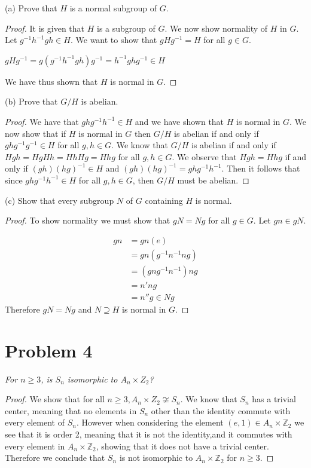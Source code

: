 \documentclass{article}
\theoremstyle{plain} %
\theoremstyle{definition} %
\begin{document}
\noindent(a) Prove that $H$ is a normal subgroup of $G$.

\begin{proof}
It is given that $H$ is a subgroup of $G$. We now show normality of $H$
in $G$. Let $g^{-1}h^{-1}gh \in H$. We want to show that $gHg^{-1} = H$ for all $g \in G$.
\begin{center}
    $gHg^{-1} = g(g^{-1}h^{-1}gh)g^{-1} = h^{-1}ghg^{-1} \in H$
\end{center}

We have thus shown that $H$ is normal in $G$.
\end{proof}

\noindent(b) Prove that $G/H$ is abelian.

\begin{proof}
    We have that $ghg^{-1}h^{-1} \in H$ and we have shown that $H$ is normal
    in $G$. We now show that if $H$ is normal
    in $G$ then $G/H$ is abelian if and only if $ghg^{-1}g^{-1} \in H$ for all
    $g, h \in G$. We know that $G/H$ is abelian if and only if $Hgh = HgHh = HhHg = Hhg$ for
    all $g,h \in G$. We observe that $Hgh = Hhg$ if and only if $(gh)(hg)^{-1} \in H$ and 
    $(gh)(hg)^{-1} = ghg^{-1}h^{-1}$. Then it follows that since 
    $ghg^{-1}h^{-1} \in H$ for all $g,h \in G$, then $G/H$ must be abelian.
\end{proof}

\noindent(c) Show that every subgroup $N$ of $G$ containing $H$ is normal.

\begin{proof}
    To show normality we must show that $gN = Ng$ for all $g \in G$.
    Let $gn \in gN$.

    \begin{align*}
        gn &= gn(e) \\
        &= gn(g^{-1}n^{-1}ng) \\
        &= (gng^{-1}n^{-1})ng \\
        &= n'ng \\
        &= n''g \in Ng
    \end{align*}
    Therefore $gN = Ng$ and $N \supseteq H$ is normal in $G$. 
\end{proof}

\section*{Problem 4}
\noindent\textit{For $n \geq 3$, is $S_n$ isomorphic to
$A_n \times Z_2$?}
\begin{proof}
    We show that for all $n \geq 3, A_n \times Z_2 \not \cong S_n$.
    We know that $S_n$ has a trivial center, meaning that no elements in $S_n$
    other than the identity commute with every element of $S_n$. However when considering
    the element $(e, 1) \in A_n \times \mathbb{Z}_2$ we see that it is order 2, meaning that
    it is not the identity,and it commutes with every element in $A_n \times \mathbb{Z}_2$, showing that it does not
    have a trivial center. Therefore we conclude that $S_n$ is not isomorphic to $A_n \times \mathbb{Z}_2$ for $n \geq 3$.
\end{proof}
\end{document}
